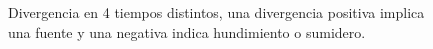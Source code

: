 \begin{figure}[!ht]
\centering
  \hfill{}\hfill
  \hfill

  \hfill{}\hfill
  \hfill
  \caption{Divergencia en 4 tiempos distintos, una divergencia positiva implica una fuente y una negativa indica hundimiento o sumidero.}%
\label{fig:dos}
\end{figure}
